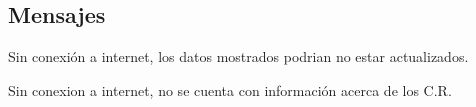 \subsection{Mensajes}

\begin{Citemize}
	\item Sin conexión a internet, los datos mostrados podrian no estar actualizados.
	\item Sin conexion a internet, no se cuenta con información acerca de los C.R.
\end{Citemize}

\clearpage